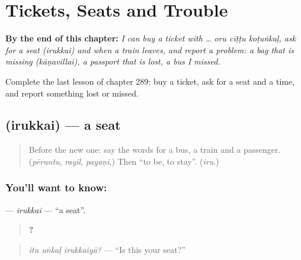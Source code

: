 
\chapter{Tickets, Seats and Trouble}
\label{ch:ta-tickets-seats-and-trouble}

\begin{chapteropening}
\textbf{By the end of this chapter:} \emph{I can buy a ticket with … oru cīṭṭu koṭuṅkaḷ, ask for a seat (irukkai) and when a train leaves, and report a problem: a bag that is missing (kāṇavillai), a passport that is lost, a bus I missed.}

Complete the last lesson of chapter 289: buy a ticket, ask for a seat and a time, and report something lost or missed.
\end{chapteropening}

\section[\texorpdfstring{\ta{இருக்கை} (irukkai)}{இருக்கை (irukkai)}]{ (irukkai) — a seat}

\label{lesson:TA-C289-irukkai}



\begin{quote}
Before the new one: say the words for a bus, a train and a passenger. (\emph{pēruntu}, \emph{rayil}, \emph{payaṇi}.) Then \textquotedblleft{}to be, to stay\textquotedblright{}. (\emph{iru}.)
\end{quote}

\subsection*{You'll want to know: }
\textbf{} — \emph{irukkai} — \textquotedblleft{}a seat\textquotedblright{}.

\begin{quote}
\textbf{  ?}
\end{quote}

\begin{quote}
\emph{itu uṅkaḷ irukkaiyā?} — \textquotedblleft{}Is this your seat?\textquotedblright{}
\end{quote}


